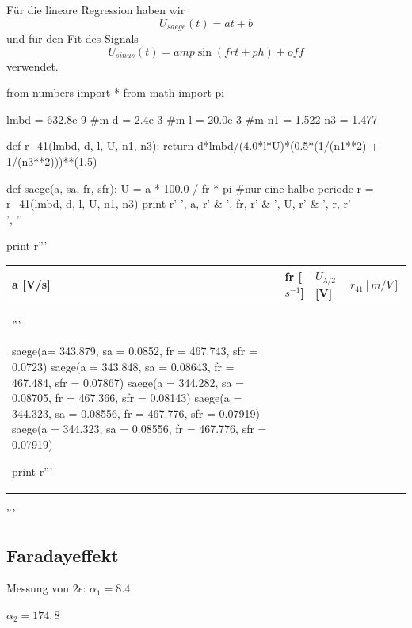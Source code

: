 Für die lineare Regression haben wir
$$ U_{saege}(t) = a  t + b $$
und für den Fit des Signals
$$ U_{sinus}(t) = \mathit{amp}  \sin(\mathit{fr} t + \mathit{ph}) + \mathit{off} $$
verwendet.


\begin{python}
from numbers import *
from math import pi

lmbd = 632.8e-9 #m
d = 2.4e-3 #m
l = 20.0e-3 #m
n1 = 1.522
n3 = 1.477

def r_41(lmbd, d, l, U, n1, n3):
  return d*lmbd/(4.0*l*U)*(0.5*(1/(n1**2) + 1/(n3**2)))**(1.5)

def saege(a, sa, fr, sfr):
  U = a * 100.0 / fr * pi #nur eine halbe periode
  r = r_41(lmbd, d, l, U, n1, n3)
  print r' ', a, r' & ', fr, r' & ', U, r' & ', r, r'\\', '\n'

print r'''\begin{table}[H]
 \begin{tabular}{llll}
  \toprule
  a [V/s]  &  fr [ $s^{-1}$] & $U_{\lambda/2}$ [V] & $r_{41} [m/V]$ \\
  \midrule
'''

saege(a= 343.879, sa = 0.0852, fr = 467.743, sfr = 0.0723)
saege(a = 343.848, sa = 0.08643, fr = 467.484, sfr = 0.07867)
saege(a = 344.282, sa = 0.08705, fr = 467.366, sfr = 0.08143)
saege(a = 344.323, sa = 0.08556, fr = 467.776, sfr = 0.07919)
saege(a = 344.323, sa = 0.08556, fr = 467.776, sfr = 0.07919)

print r'''
\bottomrule

\end{tabular}

\end{table}'''

\end{python}



\subsection{Faradayeffekt}

Messung von $2\epsilon$:
$\alpha_1 = 8.4$

$\alpha_2 = 174,8$

\newcommand{\faradayDesc}{
Wir berechnen das Magnetfeld auf der Achse:

und integrieren darüber
$\int H dl$

Vergleich mit $ H = \frac{N I}{l} $

Berechnen die Verdetkonstante

$$ \alpha = l V H $$

Wir führen eine lineare Regression durch und erhalten die Steigung $a$ und den Achsenabschnitt $b$.

Es gilt $$ \alpha = V \int H(z) dz= V 2556 I = a I + b $$

Der Achsenabschnitt $b$ enthält den Offset bei der Winkelmessung und ist nicht weiter von Bedeutung.

Somit erhalten wir die Verdetkonstante aus $$ V = \frac{a}{2556} $$  

}

